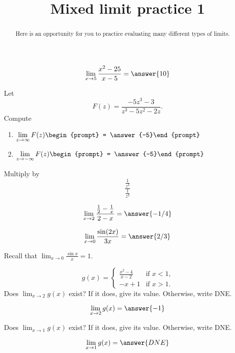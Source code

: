 \documentclass[handout]{ximera}
\title{Mixed limit practice 1}
\begin{document}
\begin{abstract}
Here is an opportunity for you to practice evaluating many different types of limits. 
\end{abstract}
\maketitle

\begin{exercise}
\[\lim_{x \to 5} \frac{x^2-25}{x-5} = \answer{10}\]
\end{exercise}

\begin{exercise}
Let 
\[
F(z) = \frac{-5 z^3-3}{z^3-5 z^2-2 z}.
\]
Compute
\begin{enumerate}
\item $\displaystyle\lim_{z\to \infty} F(z) \begin{prompt} = \answer{-5}\end{prompt}$
\item $\displaystyle\lim_{z\to -\infty}F(z) \begin{prompt} = \answer{-5}\end{prompt}$
\end{enumerate}
\begin{hint}
Multiply by
\[
\frac{\frac{1}{z^3}}{\frac{1}{z^3}}
\]
\end{hint}
\end{exercise}

\begin{exercise}
\[\lim_{x \to 2} \frac{\frac{1}{2}-\frac{1}{x}}{2-x} = \answer{-1/4}\]
\end{exercise}

\begin{exercise}
\[\lim_{x \to 0} \frac{\sin(2x)}{3x} = \answer{2/3}\]
\begin{hint}
Recall that $\displaystyle\lim_{x \to 0} \frac{\sin x}{x} = 1$.
\end{hint}
\end{exercise}

\begin{exercise}
\[
g(x) = \begin{cases}
  \frac{x^2 - 4}{x-2}  &\text{if $x<1$,} \\
  -x+1 &\text{if  $x>1$.}
\end{cases}
\]
Does $\lim_{x \to 2} g(x)$ exist?  If it does, give its value.
Otherwise, write DNE.

\[
\lim_{x \to 2} g(x) = \answer{-1}
\]

Does $\lim_{x \to 1} g(x)$ exist?  If it does, give its value.
Otherwise, write DNE.

\[
\lim_{x \to 1} g(x) = \answer{DNE}
\]
\end{exercise}
\end{document}
